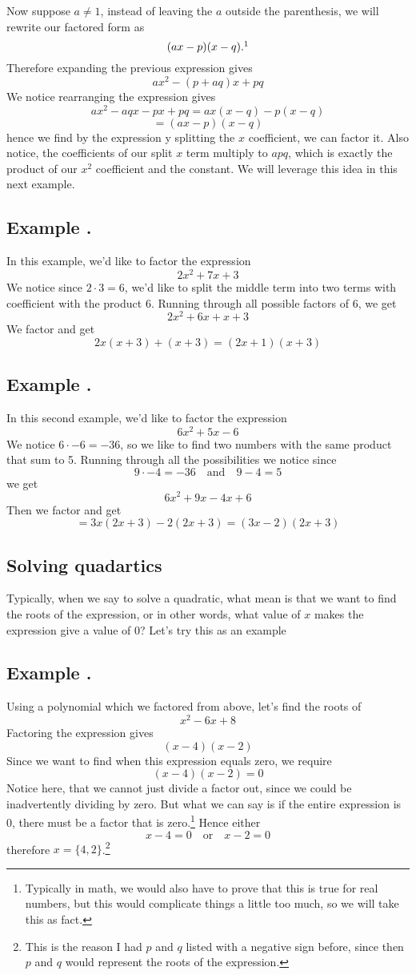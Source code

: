 \documentclass[11pt]{article}
\numberwithin{lemma}{section}
\numberwithin{equation}{section}
\numberwithin{define}{section}
\numberwithin{prop}{section}
\numberwithin{figure}{section}
\numberwithin{theorem}{section}
\numberwithin{cor}{section}
\newcounter{ex}[section]
\newenvironment{ex}[0]{

	\refstepcounter{ex}
    \subsection*{Example \theex .}
    }
    {
    \par
    }
\numberwithin{ex}{section}
\def\jand{\quad\text{and}\quad}
\def\jor{\quad\text{or}\quad}
\begin{document}
Now suppose $a\neq1$, instead of leaving the $a$ outside the parenthesis, we will rewrite our factored form as
$$(ax-p)(x-q).\footnotemark$$
Therefore expanding the previous expression gives
$$ax^2-(p+aq)x+pq$$
We notice rearranging the expression gives
$$ax^2-aqx-px+pq=ax(x-q)-p(x-q)$$
$$=(ax-p)(x-q)$$
hence we find by the expression y splitting the $x$ coefficient, we can factor it. 
Also notice, the coefficients of our split $x$ term multiply to $apq$, which is exactly the product of our $x^2$ coefficient and the constant. We will leverage this idea in this next example.

\begin{ex}
	\label{ex:1st_sm}
	In this example, we'd like to factor the expression
	$$2x^2+7x+3$$
	We notice since $2\cdot 3=6$, we'd like to split the middle term into two terms with coefficient with the product $6$. Running through all possible factors of $6$, we get
	$$2x^2+6x+x+3$$
	We factor and get
	$$2x(x+3)+(x+3)=(2x+1)(x+3)$$
\end{ex}

\begin{ex}
	In this second example, we'd like to factor the expression
	$$6x^2+5x-6$$
	We notice $6\cdot -6=-36$, so we like to find two numbers with the same product that sum to 5. Running through all the possibilities we notice since $$9\cdot -4=-36\jand 9-4=5$$
	we get
	$$6x^2+9x-4x+6$$
	Then we factor and get
	$$=3x(2x+3)-2(2x+3)=(3x-2)(2x+3)$$
\end{ex}

\subsection{Solving quadartics}
Typically, when we say to solve a quadratic, what mean is that we want to find the roots of the expression, or in other words, what value of $x$ makes the expression give a value of 0? Let's try this as an example

\begin{ex}
	Using a polynomial which we factored from above, let's find the roots of
	$$x^2-6x+8$$
	Factoring the expression gives
	$$(x-4)(x-2)$$
	Since we want to find when this expression equals zero, we require
	$$(x-4)(x-2)=0$$
	Notice here, that we cannot just divide a factor out, since we could be inadvertently dividing by zero. 
	But what we can say is if the entire expression is 0, there must be a factor that is zero.\footnote{
	Typically in math, we would also have to prove that this is true for real numbers, but this would complicate things a little too much, so we will take this as fact.}
	Hence either
	$$x-4=0 \jor x-2=0$$
	therefore $x=\{4,2\}$.\footnote{
	This is the reason I had $p$ and $q$ listed with a negative sign before, since then $p$ and $q$ would represent the roots of the expression.}
\end{ex}
\end{document}
